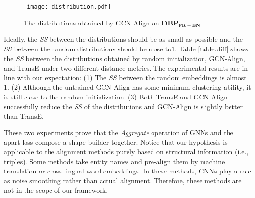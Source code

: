 \documentclass[sigconf,camera-ready]{acmart}
\begin{document}
\begin{figure}[t]
  \centering
  \texttt{[image: distribution.pdf]}
  \caption{The distributions obtained by GCN-Align on $\bm{DBP_{FR-EN}}$.}\label{distribution}
\end{figure}

\begin{table}[t]
\renewcommand\arraystretch{1.2}
\centering
{}
\caption{The \emph{SS} on different datasets and metrics. "w/o T" represents without training.}
\label{table:diff}
\end{table}

Ideally, the \emph{SS} between the distributions should be as small as possible and the \emph{SS} between the random distributions should be close to$1$.
Table \ref{table:diff} shows the \emph{SS} between the distributions obtained by random initialization, GCN-Align, and TransE under two different distance metrics.
The experimental results are in line with our expectation:
(1) The \emph{SS} between the random embeddings is almost $1$.
(2) Although the untrained GCN-Align has some minimum clustering ability, it is still close to the random initialization.
(3) Both TransE and GCN-Align successfully reduce the \emph{SS} of the distributions and GCN-Align is slightly better than TransE.

These two experiments prove that the \emph{Aggregate} operation of GNNs and the apart loss compose a shape-builder together.
Notice that our hypothesis is applicable to the alignment methods purely based on structural information (i.e., triples).
Some methods \cite{DBLP:conf/acl/XuWYFSWY19,DBLP:conf/emnlp/WuLFWZ19} take entity names and pre-align them by machine translation or cross-lingual word embeddings.
In these methods, GNNs play a role as noise smoothing rather than actual alignment.
Therefore, these methods are not in the scope of our framework.
\end{document}
